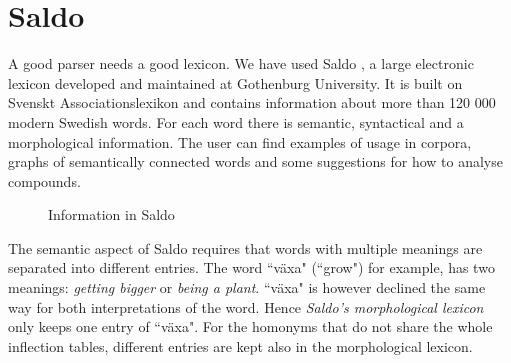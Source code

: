 \documentclass{report}
\begin{document}
\section{Saldo}
\label{sec:saldo}
A good parser needs a good lexicon. We have used Saldo \cite{saldo}, a
large electronic lexicon developed and maintained at Gothenburg University. It is
built on Svenskt Associationslexikon and contains information about more than 
120 000 modern Swedish words.
For each word there is semantic, syntactical and a morphological
information. The user can find examples of usage in corpora,
graphs of semantically connected words and some suggestions for how to analyse compounds. \\
\begin{figure}[h!]
\centering
{}
\hspace{20mm}
\caption{Information in Saldo}
\label{fig:saldo}
\end{figure}

The semantic aspect of Saldo requires that words with multiple meanings are
separated into different entries.
The word ``växa" (``grow") for example, has two meanings: \emph{getting
bigger}
or \emph{being a plant}. 
``växa" is however declined the same way for both interpretations of the word.
Hence \textit{Saldo's morphological lexicon} only keeps one entry of ``växa".
For the homonyms that do not share the whole inflection tables, different entries are 
kept also in the morphological lexicon.
\end{document}
